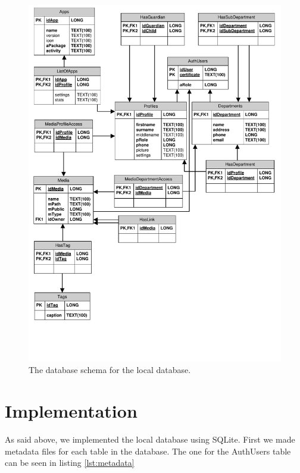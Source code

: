\begin{figure}[htbp]
	\centering
		\includegraphics[width=\textwidth]{Images/LocalDatabaseDesign}
	\caption{The database schema for the local database.}
	\label{fig:localDatabaseDesign}
\end{figure}

\section{Implementation}
\label{sec:dbImp}
As said above, we implemented the local database using SQLite. First we made metadata files for each table in the database. The one for the AuthUsers table can be seen in listing \vref{lst:metadata}

